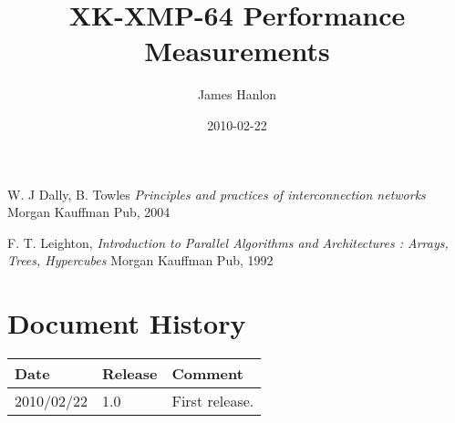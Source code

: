 \documentclass{article}
\begin{document}
\title{XK-XMP-64 Performance Measurements}
\author{James Hanlon}
\date{2010-02-22}

\maketitle






\begin{thebibliography}{9}

    W. J Dally, B. Towles
    \emph{Principles and practices of interconnection networks}
    Morgan Kauffman Pub, 2004

    F. T. Leighton,
    \emph{Introduction to Parallel Algorithms and Architectures : Arrays, Trees, Hypercubes}
    Morgan Kauffman Pub, 1992

\end{thebibliography}

\section{Document History}

\begin{small}
\renewcommand{\arraystretch}{1.25}
\begin{tabular}{| p{20mm} | p{12mm} | p{88mm}|}
\hline
\textbf{Date} & \textbf{Release} & \textbf{Comment} \\
\hline
2010/02/22 & 1.0 & First release. \\
 \hline
\end{tabular}
\end{small}
\end{document}
